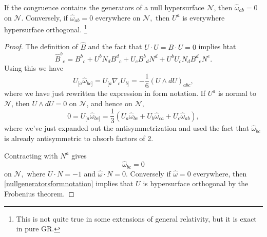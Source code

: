\begin{prop}
    If the congruence contains the generators of a null hypersurface $\mathcal{N}$, then $\hat \omega_{ab}=0$ on $\mathcal{N}$. Conversely, if $\hat \omega_{ab}=0$ everywhere on $\mathcal{N},$ then $U^a$ is everywhere hypersurface orthogonal.%
        \footnote{This is not quite true in some extensions of general relativity, but it is exact in pure GR.}
\end{prop}
\begin{proof}
    The definition of $\hat B$ and the fact that $U\cdot U = B\cdot U=0$ implies htat
    \begin{equation}
        \hat B^b{}_c = B^b{}_c + U^b N_d B^d{}_c + U_c B^b{}_d N^d + U^b U_c N_d B^d{}_e N^e.
    \end{equation}
    Using this we have
    \begin{equation}\label{nullgeneratorsformnotation}
        U_{[a}\hat \omega_{bc]}=U_{[a}\nabla_c U_{b]} =-\frac{1}{6} (U\wedge dU)_{abc},
    \end{equation}
    where we have just rewritten the expression in form notation. If $U^a$ is normal to $\mathcal{N}$, then $U\wedge dU=0$ on $\mathcal{N}$, and hence on $\mathcal{N},$
    \begin{equation}
        0=U_{[a}\hat \omega_{bc]}=\frac{1}{3} (U_a \hat \omega_{bc}+U_b \hat \omega_{ca}+ U_c \hat \omega_{ab}),
    \end{equation}
    where we've just expanded out the antisymmetrization and used the fact that $\hat \omega_{bc}$ is already antisymmetric to absorb factors of 2.
    
    Contracting with $N^a$ gives
    \begin{equation}
        \hat \omega_{bc}=0
    \end{equation}
    on $\mathcal{N},$ where $U\cdot N=-1$ and $\hat \omega \cdot N=0$. Conversely if $\hat \omega =0$ everywhere, then \ref{nullgeneratorsformnotation} implies that $U$ is hypersurface orthogonal by the Frobenius theorem.
\end{proof}